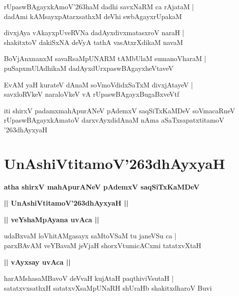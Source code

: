 \documentclass[twoside,12pt,openright]{book}
\def\S{\char'263}
\newcounter{shloka}[chapter]
\def\uvaca#1{\centerline{{\large\textbf{#1}}}}
\begin{document}
\begin{shloka}%
rUpaswBAgayxkAmoV\S haM dadhi savxNaRM ca rAjataM |\\
dadAmi kAMsayxpAtarxsathxM deVhi swbAgayxrUpakaM 
\end{shloka}

\begin{shloka}%
divxjAya vAkayxpUveRVNa dadAyxdivxmatasxroV naraH |\\
shakitxtoV dakiSxNA deVyA tathA vasAtxrXdikaM navaM
\end{shloka}

\begin{shloka}%
BoVjAnxnanxM savaRsaMpUNARM tAMbUlaM sumanoVharaM |\\
puSapxmUlAdhikaM dadAyxdUrxpaswBAgayxheVtaveV 
\end{shloka}

\begin{shloka}%
EvAM yaH kurateV dAnaM soVmoVdidxSaTxM divxjAtayeV |\\
savxloRVkeV naraloVkeV vA rUpaswBAgayxBugaBxveVtf
\end{shloka}

\begin{center}
iti shirxV padamxmahApurANeV pAdemxV saqSiTxKaMDeV soVmacaRneV rUpaswBAgayxkAmatoV darxvAyxdidAnaM 
nAma aSaTxsapatxtitamoV \S dhAyxyaH
\end{center}

\chapter{UnAshiVtitamoV\S dhAyxyaH}

\begin{center}
{\LARGE\bfseries atha shirxV mahApurANeV pAdemxV saqSiTxKaMDeV}
\end{center}

\begin{center}
{\LARGE\bfseries || UnAshiVtitamoV\S dhAyxyaH || }
\end{center}

\uvaca{|| veYshaMpAyana uvAca ||}

\begin{shloka}%
udaBxvaM loVhitAMgasayx saMtoVSaM tu janeVSu ca |\\
parxBAvAM veYBavaM jeVjaH shorxVtumicACxmi tatatxvXtaH 
\end{shloka}

\uvaca{|| vAyxsay uvAca ||}

\begin{shloka}%
harAMshasaMBavoV deVvaH kujAtaH paqthiviVsutaH |\\
satatxvxsathxH satatxvXsaMpUNaRH shUraHb shakitxdharoV Buvi
\end{shloka}
\end{document}
